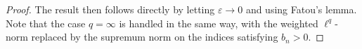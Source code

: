 \documentclass[oneside,10pt]{article}          %
\numberwithin{equation}{section}
\begin{document}
\begin{proof}
The result then follows directly by letting $\varepsilon\to0$ and using Fatou's lemma. Note that the case $q=\infty$ is handled in the same way, with the weighted $\ell^q$-norm replaced by the supremum norm on the indices satisfying $b_n>0$.
%
%
\end{proof}
\end{document}
